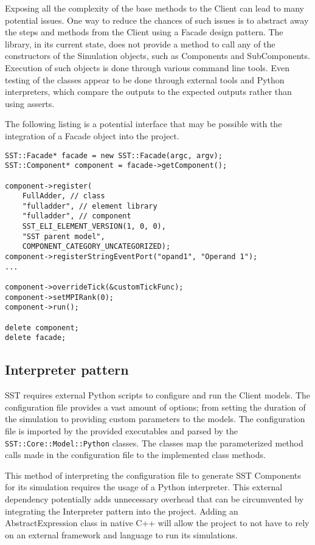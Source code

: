 Exposing all the complexity of the base methods to the Client can lead to many potential issues. One way to reduce the chances of such issues is to abstract away the steps and methods from the Client using a Facade design pattern. The library, in its current state, does not provide a method to call any of the constructors of the Simulation objects, such as Components and SubComponents. Execution of such objects is done through various command line tools. Even testing of the classes appear to be done through external tools and Python interpreters, which compare the outputs to the expected outputs rather than using asserts.

The following listing is a potential interface that may be possible with the integration of a Facade object into the project.

\begin{lstlisting}[style=customC++,label=facade,caption=Potential Implementation of Facade]
SST::Facade* facade = new SST::Facade(argc, argv);
SST::Component* component = facade->getComponent();

component->register(
    FullAdder, // class
    "fulladder", // element library
    "fulladder", // component
    SST_ELI_ELEMENT_VERSION(1, 0, 0),
    "SST parent model",
    COMPONENT_CATEGORY_UNCATEGORIZED);
component->registerStringEventPort("opand1", "Operand 1");
...

component->overrideTick(&customTickFunc);
component->setMPIRank(0);
component->run();

delete component;
delete facade;
\end{lstlisting}

\subsection{Interpreter pattern}
SST requires external Python scripts to configure and run the Client models. The configuration file provides a vast amount of options; from setting the duration of the simulation to providing custom parameters to the models. The configuration file is imported by the provided executables and parsed by the \texttt{SST::Core::Model::Python} classes. The classes map the parameterized method calls made in the configuration file to the implemented class methods.

This method of interpreting the configuration file to generate SST Components for its simulation requires the usage of a Python interpreter. This external dependency potentially adds unnecessary overhead that can be circumvented by integrating the Interpreter pattern into the project. Adding an AbstractExpression class in native C++ will allow the project to not have to rely on an external framework and language to run its simulations.

